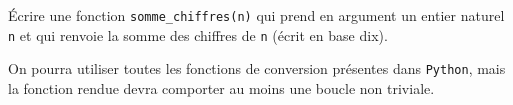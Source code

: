 \exer{}
\setcounter{numques}{0}

Écrire une fonction \texttt{somme\_chiffres(n)} qui prend en argument un entier naturel \texttt{n} et qui renvoie la somme des chiffres de \texttt{n} (écrit en base dix). 

On pourra utiliser toutes les fonctions de conversion présentes dans \texttt{Python}, mais la fonction rendue devra comporter au moins une boucle non triviale.